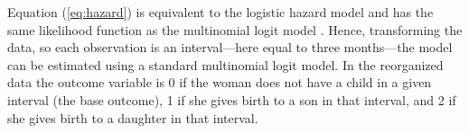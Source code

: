 \documentclass[12pt,letterpaper]{article}
\begin{document}
Equation (\ref{eq:hazard}) is equivalent to the logistic hazard model and has the same 
likelihood function as the multinomial logit model \citep{allison82,jenkins95}.
Hence, transforming the data, so each observation is an interval---here equal
to three months---the model can be estimated using a standard multinomial logit model.
%
In the reorganized data the outcome variable is 0 if the woman does not have a child in a 
given interval (the base outcome), 1 if she gives birth to a son in that interval, and 2 
if she gives birth to a daughter in that interval.

% 
\end{document}
